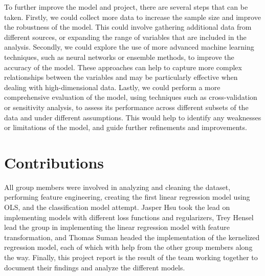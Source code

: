 \documentclass[final,5p,times,twocolumn,authoryear, 12pt]{elsarticle}
\begin{document}
To further improve the model and project, there are several steps that can be taken. Firstly, we could collect more data to increase the sample size and improve the robustness of the model. This could involve gathering additional data from different sources, or expanding the range of variables that are included in the analysis. Secondly, we could explore the use of more advanced machine learning techniques, such as neural networks or ensemble methods, to improve the accuracy of the model. These approaches can help to capture more complex relationships between the variables and may be particularly effective when dealing with high-dimensional data. Lastly, we could perform a more comprehensive evaluation of the model, using techniques such as cross-validation or sensitivity analysis, to assess its performance across different subsets of the data and under different assumptions. This would help to identify any weaknesses or limitations of the model, and guide further refinements and improvements.

\section{Contributions}

 All group members were involved in analyzing and cleaning the dataset, performing feature engineering, creating the first linear regression model using OLS, and the classification model attempt. Jasper Hsu took the lead on implementing models with different loss functions and regularizers, Trey Hensel lead the group in implementing the linear regression model with feature transformation, and Thomas Suman headed the implementation of the kernelized regression model, each of which with help from the other group members along the way. Finally, this project report is the result of the team working together to document their findings and analyze the different models.














\end{document}

